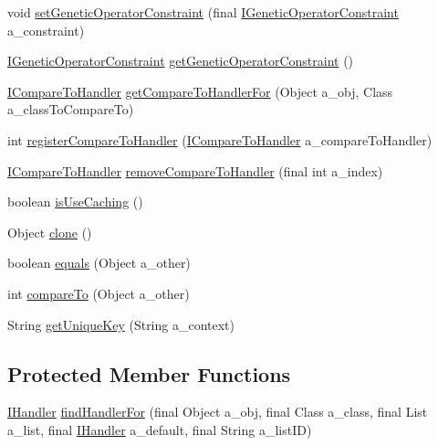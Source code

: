 \begin{DoxyCompactItemize}
\item 
void \hyperlink{classorg_1_1jgap_1_1impl_1_1_j_g_a_p_factory_aa6dde8c9ca0c2c894f340d06de68cfbf}{set\-Genetic\-Operator\-Constraint} (final \hyperlink{interfaceorg_1_1jgap_1_1_i_genetic_operator_constraint}{I\-Genetic\-Operator\-Constraint} a\-\_\-constraint)
\item 
\hyperlink{interfaceorg_1_1jgap_1_1_i_genetic_operator_constraint}{I\-Genetic\-Operator\-Constraint} \hyperlink{classorg_1_1jgap_1_1impl_1_1_j_g_a_p_factory_a8d96b264af37fc46711c443e60b0b3c2}{get\-Genetic\-Operator\-Constraint} ()
\item 
\hyperlink{interfaceorg_1_1jgap_1_1_i_compare_to_handler}{I\-Compare\-To\-Handler} \hyperlink{classorg_1_1jgap_1_1impl_1_1_j_g_a_p_factory_a5744a95f58343b23eae1478889cb6b9c}{get\-Compare\-To\-Handler\-For} (Object a\-\_\-obj, Class a\-\_\-class\-To\-Compare\-To)
\item 
int \hyperlink{classorg_1_1jgap_1_1impl_1_1_j_g_a_p_factory_aef3e4d3fefc2c54e98e296fa7b0d8406}{register\-Compare\-To\-Handler} (\hyperlink{interfaceorg_1_1jgap_1_1_i_compare_to_handler}{I\-Compare\-To\-Handler} a\-\_\-compare\-To\-Handler)
\item 
\hyperlink{interfaceorg_1_1jgap_1_1_i_compare_to_handler}{I\-Compare\-To\-Handler} \hyperlink{classorg_1_1jgap_1_1impl_1_1_j_g_a_p_factory_a27ca41d599ab25e4fb233388f60f829c}{remove\-Compare\-To\-Handler} (final int a\-\_\-index)
\item 
boolean \hyperlink{classorg_1_1jgap_1_1impl_1_1_j_g_a_p_factory_ab608008d02aeafd3421c3ccc0c760717}{is\-Use\-Caching} ()
\item 
Object \hyperlink{classorg_1_1jgap_1_1impl_1_1_j_g_a_p_factory_a131e58c62f763615b3e47555a30a5fea}{clone} ()
\item 
boolean \hyperlink{classorg_1_1jgap_1_1impl_1_1_j_g_a_p_factory_a5425c56b3f7f7402ac8b7328d3a0cf1f}{equals} (Object a\-\_\-other)
\item 
int \hyperlink{classorg_1_1jgap_1_1impl_1_1_j_g_a_p_factory_a33e990cab23de08b5953c0c4f48bc48b}{compare\-To} (Object a\-\_\-other)
\item 
String \hyperlink{classorg_1_1jgap_1_1impl_1_1_j_g_a_p_factory_ad75a20f555e6184e2dc29cd73d9b4a39}{get\-Unique\-Key} (String a\-\_\-context)
\end{DoxyCompactItemize}
\subsection*{Protected Member Functions}
\begin{DoxyCompactItemize}
\item 
\hyperlink{interfaceorg_1_1jgap_1_1_i_handler}{I\-Handler} \hyperlink{classorg_1_1jgap_1_1impl_1_1_j_g_a_p_factory_a3888002a5c5ab9cfc5244e2b6d1d8e4f}{find\-Handler\-For} (final Object a\-\_\-obj, final Class a\-\_\-class, final List a\-\_\-list, final \hyperlink{interfaceorg_1_1jgap_1_1_i_handler}{I\-Handler} a\-\_\-default, final String a\-\_\-list\-I\-D)
\end{DoxyCompactItemize}
